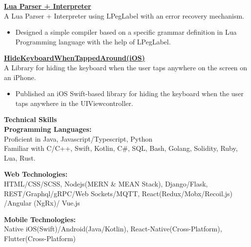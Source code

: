 \documentclass{article}
\begin{document}
\noindent \normalsize \href{https://gist.github.com/0a9d7b1a040249d1b525ab94198a42ac}{\textbf{Lua Parser + Interpreter}} \\
\noindent \normalsize A Lua Parser + Interpreter using LPegLabel with an error recovery mechanism.
\begin{itemize}
    \item Designed a simple compiler based on a specific grammar definition in Lua Programming language with the help of LPegLabel.
\end{itemize}
\vspace{3pt}

\noindent \normalsize \href{https://bit.ly/3a62RB4}{\textbf{HideKeyboardWhenTappedAround(iOS)}} \\
\noindent \normalsize A Library for hiding the keyboard when the user taps anywhere on the screen on an iPhone.
\begin{itemize}
    \item Published an iOS Swift-based library for hiding the keyboard when the user taps anywhere in the UIViewcontroller.
\end{itemize}
\vspace{3pt}

\noindent \large \textbf{\textcolor{NavyBlue}{Technical Skills}} \vspace{3pt} \\
\noindent \normalsize \textbf{Programming Languages:} \\
\noindent \normalsize Proficient in Java, Javascript/Typescript, Python \\
\noindent \normalsize Familiar with C/C++, Swift, Kotlin, C\#, SQL, Bash, Golang, Solidity, Ruby, Lua, Rust.
\vspace{3pt}

\noindent \normalsize \textbf{Web Technologies:} \\
\noindent \normalsize HTML/CSS/SCSS, Nodejs(MERN \& MEAN Stack), Django/Flask, REST/Graphql/gRPC/Web Sockets/MQTT, React(Redux/Mobx/Recoil.js) /Angular (NgRx)/ Vue.js
\vspace{3pt}

\noindent \normalsize \textbf{Mobile Technologies:} \\
\noindent \normalsize Native iOS(Swift)/Android(Java/Kotlin), React-Native(Cross-Platform), Flutter(Cross-Platform)
\vspace{3pt}
\end{document}
